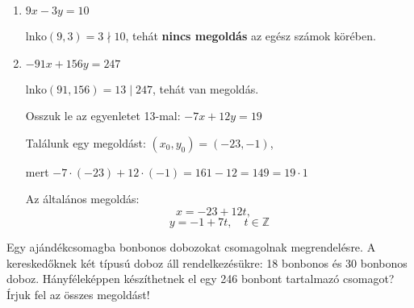 \begin{solution}
\begin{enumerate}
\item $9x-3y=10$

$\mathrm{lnko}(9,3)=3\nmid10$, tehát \textbf{nincs megoldás} az egész
számok körében.
\item $-91x+156y=247$

$\mathrm{lnko}(91,156)=13\mid247$, tehát van megoldás.

Osszuk le az egyenletet 13-mal: $-7x+12y=19$

Találunk egy megoldást: $(x_{0},y_{0})=(-23,-1)$,

mert $-7\cdot(-23)+12\cdot(-1)=161-12=149=19\cdot1$

Az általános megoldás: 
\[
x=-23+12t,\quad
\]
\[
y=-1+7t,\quad t\in\mathbb{Z}
\]

\end{enumerate}
\end{solution}
\begin{problem}
Egy ajándékcsomagba bonbonos dobozokat csomagolnak megrendelésre.
A kereskedőknek két típusú doboz áll rendelkezésükre: 18 bonbonos
és 30 bonbonos doboz. Hányféleképpen készíthetnek el egy 246 bonbont
tartalmazó csomagot? Írjuk fel az összes megoldást! 
\end{problem}

